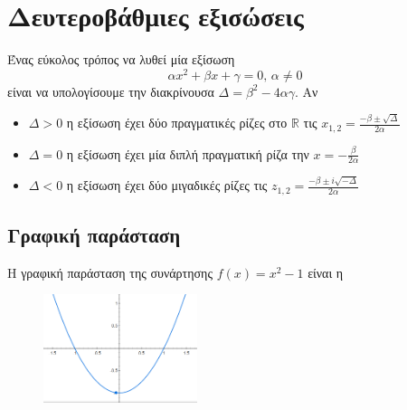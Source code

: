 \documentclass[12pt,titlepage]{article}
\begin{document}
 \section*{Δευτεροβάθμιες εξισώσεις}

   Ένας εύκολος τρόπος να λυθεί μία εξίσωση $$αx^2+βx+γ=0\text{, }α\ne 0$$ είναι να υπολογίσουμε την διακρίνουσα $Δ=β^2-4αγ$. Αν

 \begin{itemize}
   \item $Δ>0$ η εξίσωση έχει δύο πραγματικές ρίζες στο $\mathbb{R}$ τις $x_{1,2}=\frac{-β\pm \sqrt{Δ}}{2α}$
   \item $Δ=0$ η εξίσωση έχει μία διπλή πραγματική ρίζα την $x=-\frac{β}{2α}$
   \item $Δ< 0$ η εξίσωση έχει δύο μιγαδικές ρίζες τις $z_{1,2}=\frac{-β\pm i\sqrt{-Δ}}{2α}$
 \end{itemize}

\subsection*{Γραφική παράσταση}
 Η γραφική παράσταση της συνάρτησης $f(x)=x^2-1$ είναι η

 \begin{figure}[h]
   \includegraphics[width=0.4\textwidth]{plot.png}
 \end{figure}



 \def\iangle{35} %
 \def\down{-90}
 \def\arcr{0.5cm} %
\end{document}
